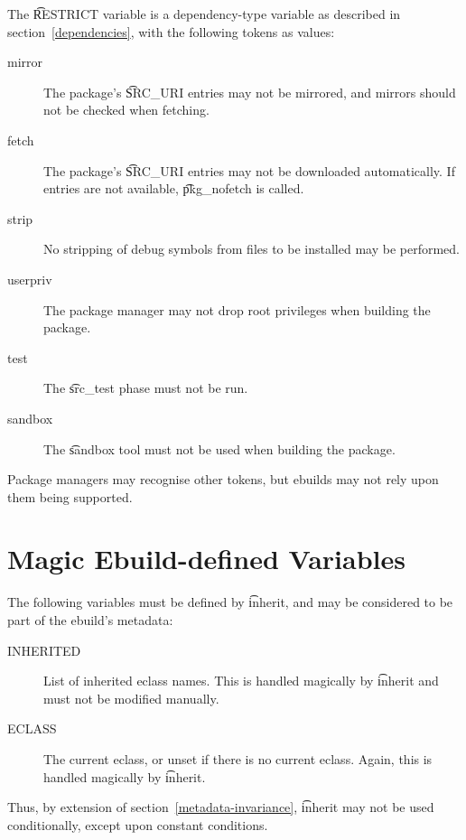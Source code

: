 The \t{RESTRICT} variable is a dependency-type variable as described in section~\ref{dependencies},
with the following tokens as values:

\begin{description}
\item[mirror] The package's \t{SRC\_URI} entries may not be mirrored, and mirrors should not
    be checked when fetching.
\item[fetch] The package's \t{SRC\_URI} entries may not be downloaded automatically. If
    entries are not available, \t{pkg\_nofetch} is called.
\item[strip] No stripping of debug symbols from files to be installed may be performed.
\item[userpriv] The package manager may not drop root privileges when building the package.
\item[test] The \t{src\_test} phase must not be run.
\item[sandbox] The \t{sandbox} tool must not be used when building the package.
\end{description}

Package managers may recognise other tokens, but ebuilds may not rely upon them being supported.

\section{Magic Ebuild-defined Variables}

The following variables must be defined by \t{inherit}, and may be considered to be part
of the ebuild's metadata:

\begin{description}
\item[INHERITED] List of inherited eclass names. This is handled magically by \t{inherit} and
    must not be modified manually.
\item[ECLASS] The current eclass, or unset if there is no current eclass. Again, this is handled
    magically by \t{inherit}.
\end{description}

\note Thus, by extension of section~\ref{metadata-invariance}, \t{inherit} may not be used
    conditionally, except upon constant conditions.


